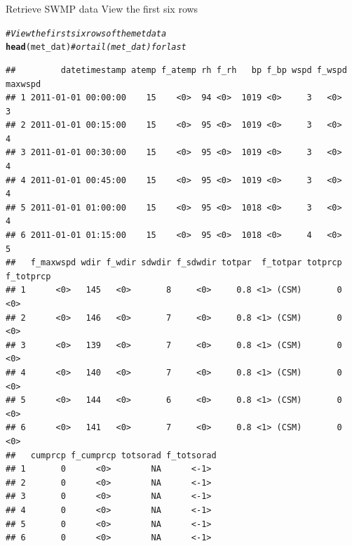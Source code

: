 \documentclass[xcolor=svgnames]{beamer}\usepackage[]{graphicx}\usepackage[]{color}
\makeatletter
\newcommand{\hlcom}[1]{\textcolor[rgb]{0.678,0.584,0.686}{\textit{#1}}}%
\newcommand{\hlstd}[1]{\textcolor[rgb]{0.345,0.345,0.345}{#1}}%
\newcommand{\hlkwd}[1]{\textcolor[rgb]{0.737,0.353,0.396}{\textbf{#1}}}%
\newenvironment{kframe}{%
 \def\at@end@of@kframe{}%
 \ifinner\ifhmode%
  \def\at@end@of@kframe{\end{minipage}}%
  \begin{minipage}{\columnwidth}%
 \fi\fi%
 \def\FrameCommand##1{\hskip\@totalleftmargin \hskip-\fboxsep
 \colorbox{shadecolor}{##1}\hskip-\fboxsep
     \hskip-\linewidth \hskip-\@totalleftmargin \hskip\columnwidth}%
 \MakeFramed {\advance\hsize-\width
   \@totalleftmargin\z@ \linewidth\hsize
   \@setminipage}}%
 {\par\unskip\endMakeFramed%
 \at@end@of@kframe}
\newenvironment{knitrout}{}{} %
\makeatother
\begin{document}
\begin{frame}{Retrieve SWMP data}
View the first six rows
\begin{knitrout}\scriptsize
{}\color{fgcolor}\begin{kframe}
\begin{alltt}
\hlcom{# View the first six rows of the met data}
\hlkwd{head}\hlstd{(met_dat)} \hlcom{# or tail(met_dat) for last}
\end{alltt}
\begin{verbatim}
##         datetimestamp atemp f_atemp rh f_rh   bp f_bp wspd f_wspd maxwspd
## 1 2011-01-01 00:00:00    15    <0>  94 <0>  1019 <0>     3   <0>        3
## 2 2011-01-01 00:15:00    15    <0>  95 <0>  1019 <0>     3   <0>        4
## 3 2011-01-01 00:30:00    15    <0>  95 <0>  1019 <0>     3   <0>        4
## 4 2011-01-01 00:45:00    15    <0>  95 <0>  1019 <0>     3   <0>        4
## 5 2011-01-01 01:00:00    15    <0>  95 <0>  1018 <0>     3   <0>        4
## 6 2011-01-01 01:15:00    15    <0>  95 <0>  1018 <0>     4   <0>        5
##   f_maxwspd wdir f_wdir sdwdir f_sdwdir totpar  f_totpar totprcp f_totprcp
## 1      <0>   145   <0>       8     <0>     0.8 <1> (CSM)       0      <0> 
## 2      <0>   146   <0>       7     <0>     0.8 <1> (CSM)       0      <0> 
## 3      <0>   139   <0>       7     <0>     0.8 <1> (CSM)       0      <0> 
## 4      <0>   140   <0>       7     <0>     0.8 <1> (CSM)       0      <0> 
## 5      <0>   144   <0>       6     <0>     0.8 <1> (CSM)       0      <0> 
## 6      <0>   141   <0>       7     <0>     0.8 <1> (CSM)       0      <0> 
##   cumprcp f_cumprcp totsorad f_totsorad
## 1       0      <0>        NA      <-1> 
## 2       0      <0>        NA      <-1> 
## 3       0      <0>        NA      <-1> 
## 4       0      <0>        NA      <-1> 
## 5       0      <0>        NA      <-1> 
## 6       0      <0>        NA      <-1>
\end{verbatim}
\end{kframe}
\end{knitrout}
\end{frame}
\end{document}
